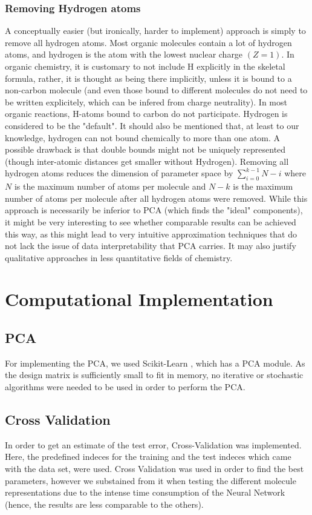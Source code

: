 \documentclass[11pt,a4paper,notitlepage]{article}
\begin{document}
\subsubsection{Removing Hydrogen atoms}
A conceptually easier (but ironically, harder to implement) approach is simply to remove all hydrogen atoms. Most organic molecules contain a lot of hydrogen atoms, and hydrogen is the atom with the lowest nuclear charge $(Z=1)$. In organic chemistry, it is customary to not include H explicitly in the skeletal formula, rather, it is thought as being there implicitly, unless it is bound to a non-carbon molecule (and even those bound to different molecules do not need to be written explicitely, which can be infered from charge neutrality). In most organic reactions, H-atoms bound to carbon do not participate. Hydrogen is considered to be the "default". It should also be mentioned that, at least to our knowledge, hydrogen can not bound chemically to more than one atom. A possible drawback is that double bounds might not be uniquely represented (though inter-atomic distances get smaller without Hydrogen). Removing all hydrogen atoms reduces the dimension of parameter space by $\sum_{i=0}^{k-1}N-i$ where $N$ is the maximum number of atoms per molecule and $N-k$ is the maximum number of atoms per molecule after all hydrogen atoms were removed. While this approach is necessarily be inferior to PCA (which finds the "ideal" components), it might be very interesting to see whether comparable results can be achieved this way, as this might lead to very intuitive approximation techniques that do not lack the issue of data interpretability that PCA carries. It may also justify qualitative approaches in less quantitative fields of chemistry.  
\section{Computational Implementation}
\subsection{PCA}
For implementing the PCA, we used Scikit-Learn \citep{scikit-learn}, which has a PCA module. As the design matrix is sufficiently small to fit in memory, no iterative or stochastic algorithms were needed to be used in order to perform the PCA. 
\subsection{Cross Validation}
In order to get an estimate of the test error, Cross-Validation \citep{Project1} was implemented. Here, the predefined indeces for the training and the test indeces which came with the data set, were used. Cross Validation was used in order to find the best parameters, however we substained from it when testing the different molecule representations due to the intense time consumption of the Neural Network (hence, the results are less comparable to the others). 
\end{document}
